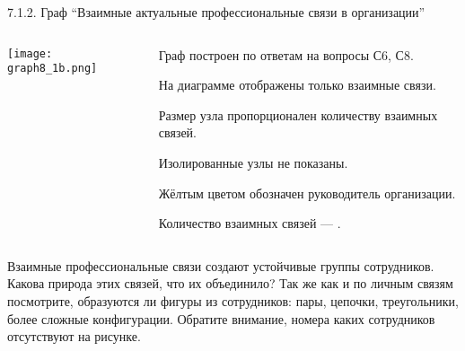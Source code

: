 \begin{frame}{7.1.2. Граф ``Взаимные актуальные профессиональные связи в организации''}

\begin{columns}
\begin{column}{0.7\textwidth} 
\centering
          \texttt{[image: graph8\_1b.png]}
\end{column}
\begin{column}{0.25\textwidth} 

\tiny
Граф построен по ответам на вопросы С6, С8.
\smallskip

На диаграмме отображены только взаимные связи.
\smallskip

Размер узла пропорционален количеству взаимных связей.
\smallskip

Изолированные узлы не показаны.
\smallskip

Жёлтым цветом обозначен руководитель организации.
\bigskip

Количество взаимных связей --- \valHABlinks.

\end{column}
\end{columns}

\fontsize{6pt}{7}\selectfont
Взаимные профессиональные связи создают устойчивые группы сотрудников. 
Какова природа этих связей, что их объединило?
Так же как  и по личным связям посмотрите, образуются ли фигуры из сотрудников: 
пары, цепочки, треугольники, более сложные конфигурации. 
Обратите внимание, номера каких сотрудников отсутствуют на рисунке. 


\end{frame}


